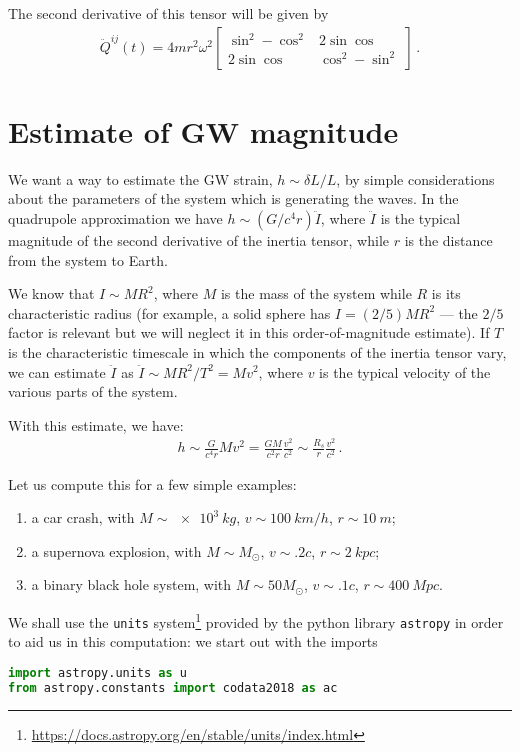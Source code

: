 \documentclass[main.tex]{subfiles}
\begin{document}
The second derivative of this tensor will be given by 
%
\begin{align}
\ddot{Q}^{ij}(t) = 4 m r^2 \omega^2 \left[\begin{array}{cc}
\sin^2 - \cos^2 & 2 \sin \cos \\ 
2 \sin \cos & \cos^2 - \sin^2
\end{array}\right]
\,.
\end{align}

\section{Estimate of GW magnitude}

We want a way to estimate the GW strain, \(h \sim \delta L / L\), by simple considerations about the parameters of the system which is generating the waves. 
In the quadrupole approximation we have \(h \sim (G / c^{4} r) \ddot{I}\), where \(\ddot{I}\) is the typical magnitude of the second derivative of the inertia tensor, while \(r\) is the distance from the system to Earth. 

We know that \(I \sim M R^2\), where \(M\) is the mass of the system while \(R\) is its characteristic radius (for example, a solid sphere has \(I = (2/5)  M R^2 \) --- the \(2/5\) factor is relevant but we will neglect it in this order-of-magnitude estimate).
If \(T\) is the characteristic timescale in which the components of the inertia tensor vary, we can estimate \(\ddot{I}\) as \(\ddot{I} \sim M R^2 / T^2 = M v^2\), where \(v\) is the typical velocity of the various parts of the system. 

With this estimate, we have: 
%
\begin{align}
h \sim \frac{G}{c^{4}r} M v^2 = \frac{GM}{c^2 r} \frac{v^2}{c^2} \sim \frac{R_s}{r} \frac{v^2}{c^2}
\,.
\end{align}

Let us compute this for a few simple examples: 
\begin{enumerate}
    \item a car crash, with \(M \sim \SI{e3}{kg}\), \(v \sim \SI{100}{km/h}\), \(r \sim \SI{10}{m}\);
    \item a supernova explosion, with \(M \sim M_{\odot}\), \(v \sim \num{.2}c\), \(r \sim \SI{2}{kpc}\);
    \item a binary black hole system, with \(M \sim 50M_{\odot}\), \(v \sim \num{.1}c\), \(r \sim \SI{400}{Mpc}\).
\end{enumerate}

We shall use the \texttt{units} system\footnote{\url{https://docs.astropy.org/en/stable/units/index.html}} provided by the python library \texttt{astropy} in order to aid us in this computation: 
we start out with the imports 
\begin{lstlisting}[language=Python]
import astropy.units as u
from astropy.constants import codata2018 as ac
\end{lstlisting}
\end{document}
